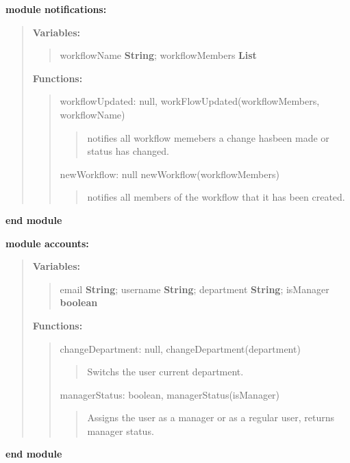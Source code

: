 \documentclass{article}[draft]
\begin{document}
\noindent \textbf{module notifications:}
\begin{quote}
  \textbf{Variables:}
  \begin{quote}
    workflowName \textbf{String}; workflowMembers \textbf{List}
  \end{quote}

  \textbf{Functions:}
  \begin{quote}

    workflowUpdated: null, workFlowUpdated(workflowMembers, workflowName)
    \begin{quote}
      notifies all workflow memebers a change hasbeen made or status has changed.
    \end{quote}

    newWorkflow: null newWorkflow(workflowMembers)
    \begin{quote}
      notifies all members of the workflow that it has been created.
    \end{quote}

  \end{quote}
\end{quote}
\textbf{end module}
\bigbreak

\noindent \textbf{module accounts:}
\begin{quote}

  \textbf{Variables:}
  \begin{quote}
    email \textbf{String}; username \textbf{String}; department \textbf{String}; isManager \textbf{boolean}
  \end{quote}
  \textbf{Functions:}
  \begin{quote}

    changeDepartment: null, changeDepartment(department)
    \begin{quote}
      Switchs the user current department.
    \end{quote}


    managerStatus: boolean, managerStatus(isManager)
    \begin{quote}
      Assigns the user as a manager or as a regular user, returns manager status.
    \end{quote}

  \end{quote}
\end{quote}
\textbf{end module}
\end{document}
